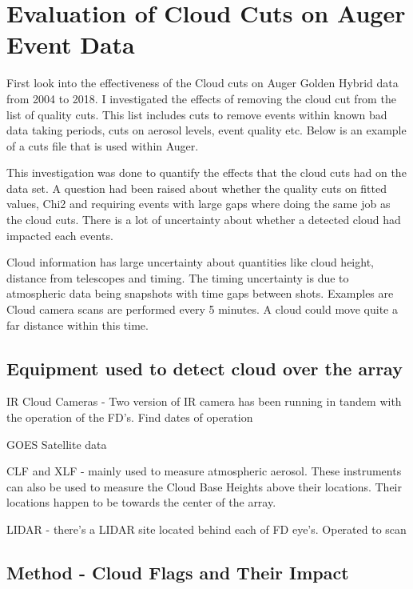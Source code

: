 \chapter[Evaluation of Cloud Cuts on Auger Event Data]{\centering Evaluation of Cloud Cuts on Auger Event Data \\}\label{Ch:CloudCuts}

First look into the effectiveness of the Cloud cuts on Auger Golden Hybrid data from 2004 to 2018.
I investigated the effects of removing the cloud cut from the list of quality cuts. This list includes cuts to remove events within known bad data taking periods, cuts on aerosol levels, event quality etc. Below is an example of a cuts file that is used within Auger.

This investigation was done to quantify the effects that the cloud cuts had on the data set. A question had been raised about whether the quality cuts on fitted values, Chi2 and requiring events with large gaps where doing the same job as the cloud cuts. There is a lot of uncertainty about whether a detected cloud had impacted each events.

Cloud information has large uncertainty about quantities like cloud height, distance from telescopes and timing. The timing uncertainty is due to atmospheric data being snapshots with time gaps between shots. Examples are Cloud camera scans are performed every 5 minutes. A cloud could move quite a far distance within this time.

\section{Equipment used to detect cloud over the array}

IR Cloud Cameras - Two version of IR camera has been running in tandem with the operation of the FD's. Find dates of operation

GOES Satellite data

CLF and XLF - mainly used to measure atmospheric aerosol. These instruments can also be used to measure the Cloud Base Heights above their locations. Their locations happen to be towards the center of the array.

LIDAR - there's a LIDAR site located behind each of FD eye's. Operated to scan 



\section{Method - Cloud Flags and Their Impact}

